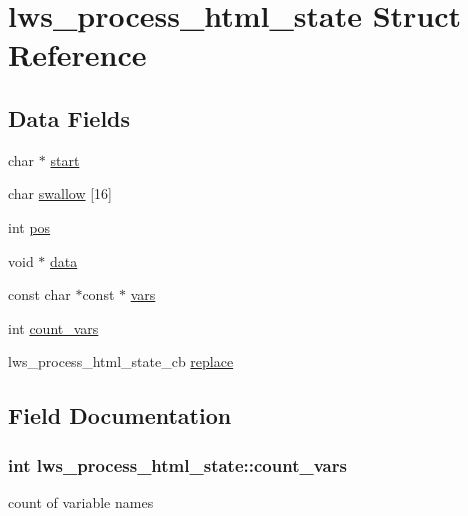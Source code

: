 \hypertarget{structlws__process__html__state}{}\section{lws\+\_\+process\+\_\+html\+\_\+state Struct Reference}
\label{structlws__process__html__state}
\subsection*{Data Fields}
\begin{DoxyCompactItemize}
\item 
char $\ast$ \hyperlink{structlws__process__html__state_af0732884ef891e24fe5fa237ebaa21a3}{start}
\item 
char \hyperlink{structlws__process__html__state_a71982bc1cbd8cf876ca0f545144404eb}{swallow} \mbox{[}16\mbox{]}
\item 
int \hyperlink{structlws__process__html__state_a53234f2948812c7208a256f9f5b23c20}{pos}
\item 
void $\ast$ \hyperlink{structlws__process__html__state_af21119890fdfebe28fb5c4dabfc1bdf5}{data}
\item 
const char $\ast$const $\ast$ \hyperlink{structlws__process__html__state_a3b113e00c03a2fded51b1c85ff5bf077}{vars}
\item 
int \hyperlink{structlws__process__html__state_adcafd17704775b4bbeea9561fb340968}{count\+\_\+vars}
\item 
lws\+\_\+process\+\_\+html\+\_\+state\+\_\+cb \hyperlink{structlws__process__html__state_a693d2fb45378afee5da29b539c1ea644}{replace}
\end{DoxyCompactItemize}


\subsection{Field Documentation}
\subsubsection[{\texorpdfstring{count\+\_\+vars}{count\_vars}}]{\setlength{\rightskip}{0pt plus 5cm}int lws\+\_\+process\+\_\+html\+\_\+state\+::count\+\_\+vars}\hypertarget{structlws__process__html__state_adcafd17704775b4bbeea9561fb340968}{}\label{structlws__process__html__state_adcafd17704775b4bbeea9561fb340968}
count of variable names 
